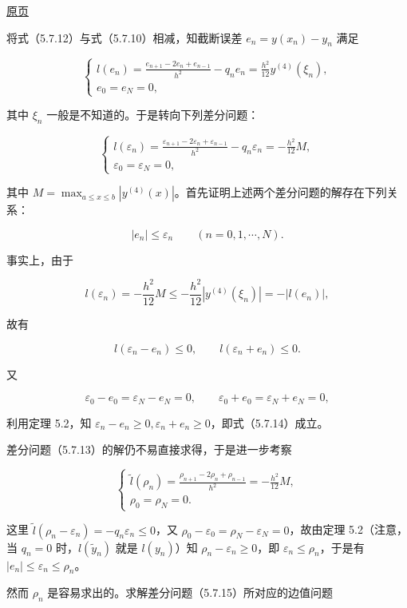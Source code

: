 \documentclass[
  10pt,
  fontset=fandol]{ctexart}
\begin{document}
\href{../../source-images/pdf-152.jpeg}{原页}

将式（5.7.12）与式（5.7.10）相减，知截断误差 \(e_n=y(x_n)-y_n\) 满足

\[
\begin{cases}
\displaystyle l(e_n)=\frac{e_{n+1}-2e_n+e_{n-1}}{h^2}-q_ne_n=\frac{h^2}{12}y^{(4)}(\xi_n),\\[6pt]
e_0=e_N=0,
\end{cases}
\]

其中 \(\xi_n\) 一般是不知道的。于是转向下列差分问题：

\[
\begin{cases}
\displaystyle l(\varepsilon_n)=\frac{\varepsilon_{n+1}-2\varepsilon_n+\varepsilon_{n-1}}{h^2}-q_n\varepsilon_n=-\frac{h^2}{12}M,\\[6pt]
\varepsilon_0=\varepsilon_N=0,
\end{cases}
\tag{5.7.13}
\]

其中 \(M=\max_{a\le x\le b}|y^{(4)}(x)|\)。首先证明上述两个差分问题的解存在下列关系：

\[
|e_n|\le\varepsilon_n\qquad(n=0,1,\cdots,N).
\tag{5.7.14}
\]

事实上，由于

\[
l(\varepsilon_n)=-\frac{h^2}{12}M\le-\frac{h^2}{12}|y^{(4)}(\xi_n)|=-|l(e_n)|,
\]

故有

\[
l(\varepsilon_n-e_n)\le0,\qquad l(\varepsilon_n+e_n)\le0.
\]

又

\[
\varepsilon_0-e_0=\varepsilon_N-e_N=0,\qquad\varepsilon_0+e_0=\varepsilon_N+e_N=0,
\]

利用定理 5.2，知 \(\varepsilon_n-e_n\ge0,\varepsilon_n+e_n\ge0\)，即式（5.7.14）成立。

差分问题（5.7.13）的解仍不易直接求得，于是进一步考察

\[
\begin{cases}
\displaystyle\tilde l(\rho_n)=\frac{\rho_{n+1}-2\rho_n+\rho_{n-1}}{h^2}=-\frac{h^2}{12}M,\\[6pt]
\rho_0=\rho_N=0.
\end{cases}
\tag{5.7.15}
\]

这里 \(\tilde l(\rho_n-\varepsilon_n)=-q_n\varepsilon_n\le0\)，又 \(\rho_0-\varepsilon_0=\rho_N-\varepsilon_N=0\)，故由定理 5.2（注意，当 \(q_n=0\) 时，\(l(\tilde y_n)\) 就是 \(l(y_n)\)）知 \(\rho_n-\varepsilon_n\ge0\)，即 \(\varepsilon_n\le\rho_n\)，于是有 \(|e_n|\le\varepsilon_n\le\rho_n\)。

然而 \(\rho_n\) 是容易求出的。求解差分问题（5.7.15）所对应的边值问题
\end{document}
